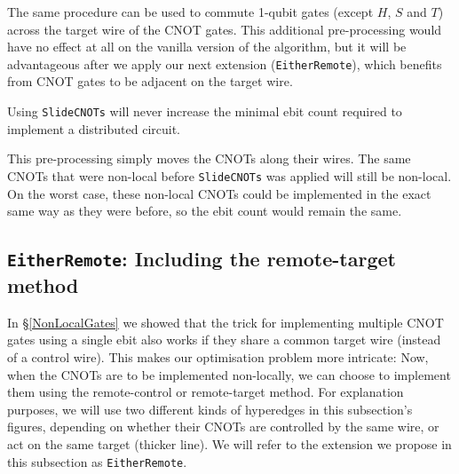 

The same procedure can be used to commute 1-qubit gates (except \(H\), \(S\) and \(T\)) across the target wire of the CNOT gates. This additional pre-processing would have no effect at all on the vanilla version of the algorithm, but it will be advantageous after we apply our next extension (\texttt{EitherRemote}), which benefits from CNOT gates to be adjacent on the target wire.

\begin{remark} 
Using \texttt{SlideCNOTs} will never increase the minimal ebit count required to implement a distributed circuit.

\normalfont
This pre-processing simply moves the CNOTs along their wires. The same CNOTs that were non-local before \texttt{SlideCNOTs} was applied will still be non-local. On the worst case, these non-local CNOTs could be implemented in the exact same way as they were before, so the ebit count would remain the same.

\label{thm:SlideCNOTsImprove}
\end{remark}

\subsection{\texttt{EitherRemote}: Including the remote-target method}
\label{BothEnds}

In \S\ref{NonLocalGates} we showed that the trick for implementing multiple CNOT gates using a single ebit also works if they share a common target wire (instead of a control wire). This makes our optimisation problem more intricate: Now, when the CNOTs are to be implemented non-locally, we can choose to implement them using the remote-control or remote-target method. For explanation purposes, we will use two different kinds of hyperedges in this subsection's figures, depending on whether their CNOTs are controlled by the same wire, or act on the same target (thicker line). We will refer to the extension we propose in this subsection as \texttt{EitherRemote}.



